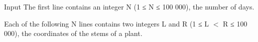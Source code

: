 Input
The first line contains an integer N (1 ≤ N ≤ 100 000), the number of days.  

   Each of the following N lines contains two integers L and R (1 ≤ L $<$ R ≤ 100 000), the coordinates of the stems of a plant.